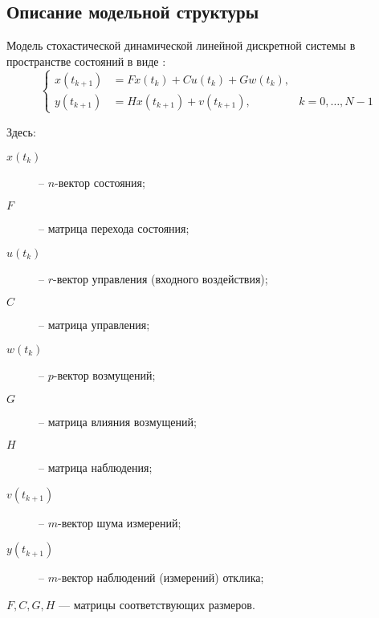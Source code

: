 \documentclass[a4paper,14pt]{extarticle}
\renewcommand{\vec}[1]{#1}
\begin{document}
\newpage
\subsection{Описание модельной структуры}

Модель стохастической динамической линейной дискретной системы в пространстве
состояний в виде \cite{mono}:
\begin{equation}
  \label{eq:initmod}
  \left\{ 
    \begin{array}{lll}
      \vec{x}(t_{k+1}) &= F \vec{x}(t_k) + C \vec{u}(t_k) + G \vec{w}(t_k),&\\
      \vec{y}(t_{k+1}) &= H \vec{x}(t_{k+1}) + \vec{v}(t_{k+1}), 
      & k = 0,\ldots, N-1
    \end{array} 
  \right. 
\end{equation}

Здесь:
\begin{description}
  \item [$\vec{x}(t_k)$] -- $n$-вектор состояния;
  \item [$F$] -- матрица перехода состояния;
  \item [$\vec{u}(t_k)$] -- $r$-вектор управления (входного воздействия);
  \item [$C$] -- матрица управления;
  \item [$\vec{w}(t_k)$] -- $p$-вектор возмущений;
  \item [$G$] -- матрица влияния возмущений;
  \item [$H$] -- матрица наблюдения;
  \item [$\vec{v}(t_{k+1})$] -- $m$-вектор шума измерений;
  \item [$\vec{y}(t_{k+1})$] -- $m$-вектор наблюдений (измерений) отклика;
\end{description}

$F, C, G, H$ --- матрицы соответствующих размеров.
\end{document}
